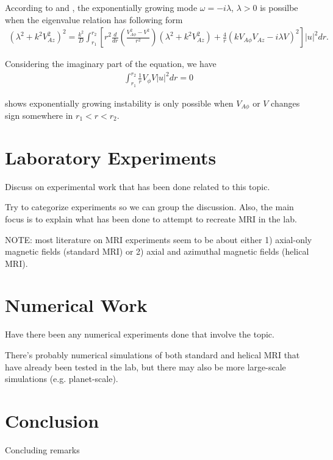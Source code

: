 \documentclass{jfm}
\begin{document}
According to \cite{Knobloch1992} and \cite{Julien2010}, the exponentially growing mode $\omega =-i\lambda$, $\lambda>0$ is possilbe when the eigenvalue relation has following form
\begin{align}
    (\lambda^2 +k^2 V_{Az}^2)^2 = \frac{k^2}{D}\int_{r_1}^{r_2} \left[ r^2 \frac{d}{dr}\left( \frac{V_{A\phi}^2-V^2}{r^2}\right)(\lambda^2+k^2 V_{Az}^2) + \frac{4}{r}(k V_{A\phi} V_{Az}-i\lambda V)^2 \right]|u|^2 dr.
\end{align}

Considering the imaginary part of the equation, we have 
\begin{align}
    \int_{r_1}^{r_2} \frac{1}{r}V_\phi V |u|^2 dr =0
\end{align}

\cite{Knobloch1992} shows exponentially growing instability is only possible when $V_{A\phi}$ or $V$ changes sign somewhere in $r_1< r < r_2$.



\section{Laboratory Experiments}
Discuss on experimental work that has been done related to this topic.

Try to categorize experiments so we can group the discussion. Also, the main
focus is to explain what has been done to attempt to recreate MRI in the lab.

NOTE: most literature on MRI experiments seem to be about either 1) axial-only
magnetic fields (standard MRI) or 2) axial and azimuthal magnetic fields
(helical MRI).



\section{Numerical Work}
Have there been any numerical experiments done that involve the topic.

There's probably numerical simulations of both standard and helical MRI that
have already been tested in the lab, but there may also be more large-scale
simulations (e.g. planet-scale).



\section{Conclusion}
Concluding remarks





\end{document}
